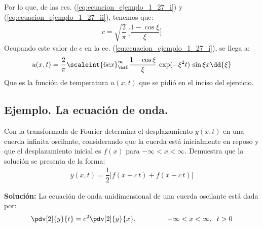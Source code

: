 Por lo que, de las ecs. (\ref{eq:ecuacion_ejemplo_1_27_i}) y (\ref{eq:ecuacion_ejemplo_1_27_ii}), tenemos que:
\begin{align*}
c = \sqrt{\dfrac{2}{\pi}} \, \bigg[ \dfrac{1 - \cos \xi}{\xi} \bigg]
\end{align*}
Ocupando este valor de $c$ en la ec. (\ref{eq:ecuacion_ejemplo_1_27_i}), se llega a:
\begin{align*}
u(x, t) = \dfrac{2}{\pi} \scaleint{6ex}_{\bs 0}^{\infty} \dfrac{1 - \cos \xi}{\xi} \, \exp(-\xi^{2} t) \, \sin \xi x\dd{\xi}
\end{align*}
Que es la función de temperatura $u(x, t)$ que se pidió en el inciso del ejercicio.

\subsection*{Ejemplo. La ecuación de onda.}

Con la transformada de Fourier determina el desplazamiento $y(x, t)$ en una cuerda infinita oscilante, considerando que la cuerda está inicialmente en reposo y que el desplazamiento inicial es $f(x)$ para $-\infty < x < \infty$. Demuestra que la solución se presenta de la forma:
\begin{align*}
y(x, t) = \dfrac{1}{2} \big[ f(x + c \, t) + f(x - c \, t) \big]
\end{align*}
\par
\noindent
\textbf{Solución: } La ecuación de onda unidimensional de una cuerda oscilante está dada por:
\begin{align*}
\pdv[2]{y}{t} = c^{2} \pdv[2]{y}{x}, \hspace{1.5cm} -\infty < x < \infty, \hspace{0.2cm} t > 0
\end{align*}


